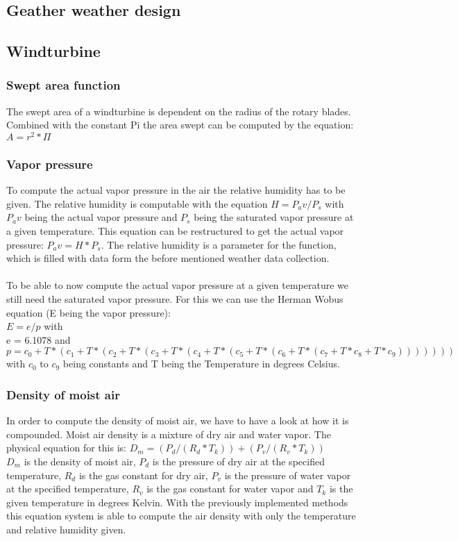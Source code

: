 \subsection{Geather weather design}

\subsection{Windturbine}
\subsubsection{Swept area function}
The swept area of a windturbine is dependent on the radius of the rotary blades. Combined with the constant Pi the area swept can be computed by the equation: $A = r^{2}* \Pi $
\subsubsection{Vapor pressure}
To compute the actual vapor pressure in the air the relative humidity has to be given. The relative humidity is computable with the equation $H = P_av / P_s$ with $P_av$ being the actual vapor pressure and $P_s$ being the saturated vapor pressure at a given temperature. This equation can be restructured to get the actual vapor pressure: $P_av  = H * P_s$. The relative humidity is a parameter for the function, which is filled with data form the before mentioned weather data collection.\\
\\
To be able to now compute the actual vapor pressure at a given temperature we still need the saturated vapor pressure. For this we can use the Herman Wobus equation (E being the vapor pressure):\\
$E = e/p$ with\\
e = 6.1078 and\\
$p = c_0 + T * (c_1 + T * (c_2 + T * (c_3 + T * (c_4 + T *(c_5 + T * (c_6 + T * (c_7 + T * c_8 + T * c_9)))))))$\\
with $c_0$ to $c_9$ being constants and T being the Temperature in degrees Celsius.
\subsubsection{Density of moist air}
In order to compute the density of moist air, we have to have a look at how it is compounded. Moist air density is a mixture of dry air and water vapor. The physical equation for this is: $D_m = (P_d/(R_d * T_k))+(P_v/(R_v*T_k))$\\
$D_m$ is the density of moist air, $P_d$ is the pressure of dry air at the specified temperature, $R_d$ is the gas constant for dry air, $P_v$ is the pressure of water vapor at the specified temperature, $R_v$ is the gas constant for water vapor and $T_k$ is the given temperature in degrees Kelvin. With the previously implemented methods this equation system is able to compute the air density with only the temperature and relative humidity given.
